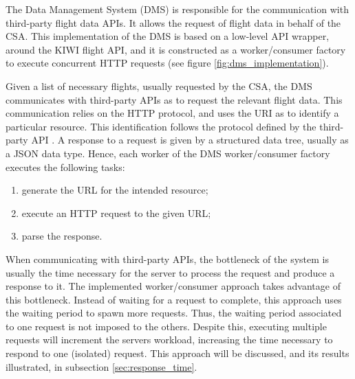The Data Management System (DMS) is responsible for the communication with third-party flight data APIs. It allows the request of flight data in behalf of the CSA. This implementation of the DMS is based on a low-level API wrapper, around the KIWI flight API, and it is constructed as a worker/consumer factory to execute concurrent HTTP requests (see figure \ref{fig:dms_implementation}). 


Given a list of necessary flights, usually requested by the CSA, the DMS communicates with third-party APIs as to request the relevant flight data. This communication relies on the HTTP protocol, and uses the URI as to identify a particular resource. This identification follows the protocol defined by the third-party API \cite{kiwi_api}. A response to a request is given by a structured data tree, usually as a JSON data type. Hence, each worker of the DMS worker/consumer factory executes the following tasks:
\begin{enumerate}
  \item generate the URL for the intended resource;
  \item execute an HTTP request to the given URL;
  \item parse the response.
\end{enumerate}

When communicating with third-party APIs, the bottleneck of the system is usually the time necessary for the server to process the request and produce a response to it. The implemented worker/consumer approach takes advantage of this bottleneck. Instead of waiting for a request to complete, this approach uses the waiting period to spawn more requests. Thus, the waiting period associated to one request is not imposed to the others. Despite this, executing multiple requests will increment the servers workload, increasing the time necessary to respond to one (isolated) request. This approach will be discussed, and its results illustrated, in subsection \ref{sec:response_time}. 


